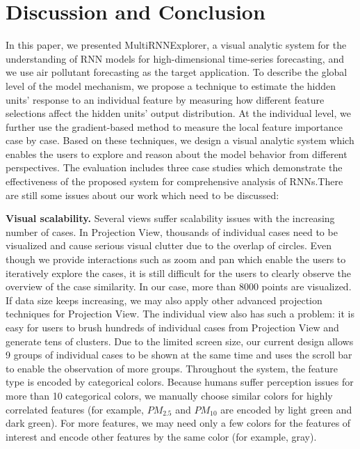 \section{Discussion and Conclusion}

In this paper, we presented MultiRNNExplorer, a visual analytic system for the understanding of RNN models for high-dimensional time-series forecasting, and we use air pollutant forecasting as the target application. 
To describe the global level of the model mechanism, we propose a technique to estimate the hidden units' response to an individual feature by measuring how different feature selections affect the hidden units' output distribution. At the individual level, we further use the gradient-based method to measure the local feature importance case by case. Based on these techniques, we design a visual analytic system which enables the users to explore and reason about the model behavior from different perspectives. The evaluation includes three case studies which demonstrate the effectiveness of the proposed system for comprehensive analysis of RNNs.There are still some issues about our work which need to be discussed:

\textbf{Visual scalability.} Several views suffer scalability issues with the increasing number of cases. In Projection View, thousands of individual cases need to be visualized and cause serious visual clutter due to the overlap of circles.  Even though we provide interactions such as zoom and pan which enable the users to iteratively explore the cases, it is still difficult for the users to clearly observe the overview of the case similarity.  In our case, more than 8000 points are visualized. If data size keeps increasing, we may also apply other advanced projection techniques\cite{van2017visual, pezzotti2016hierarchical} for Projection View. 
The individual view also has such a problem: it is easy for users to brush hundreds of individual cases from Projection View and generate tens of clusters. Due to the limited screen size, our current design allows 9 groups of individual cases to be shown at the same time and uses the scroll bar to enable the observation of more groups.
Throughout the system, the feature type is encoded by categorical colors. Because humans suffer perception issues for more than 10 categorical colors, we manually choose similar colors for highly correlated features (for example, $PM_{2.5}$ and $PM_{10}$ are encoded by light green and dark green). For more features, we may need only a few colors for the features of interest and encode other features by the same color (for example, gray). 

